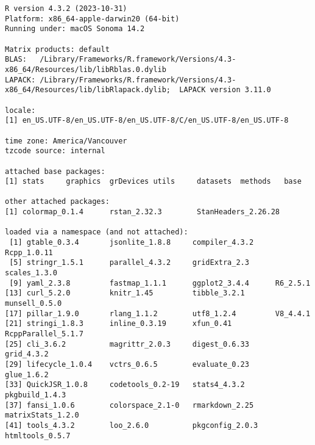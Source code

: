 \documentclass[
  letterpaper,
  DIV=11,
  numbers=noendperiod]{scrartcl}
\begin{document}
\begin{verbatim}
R version 4.3.2 (2023-10-31)
Platform: x86_64-apple-darwin20 (64-bit)
Running under: macOS Sonoma 14.2

Matrix products: default
BLAS:   /Library/Frameworks/R.framework/Versions/4.3-x86_64/Resources/lib/libRblas.0.dylib 
LAPACK: /Library/Frameworks/R.framework/Versions/4.3-x86_64/Resources/lib/libRlapack.dylib;  LAPACK version 3.11.0

locale:
[1] en_US.UTF-8/en_US.UTF-8/en_US.UTF-8/C/en_US.UTF-8/en_US.UTF-8

time zone: America/Vancouver
tzcode source: internal

attached base packages:
[1] stats     graphics  grDevices utils     datasets  methods   base     

other attached packages:
[1] colormap_0.1.4      rstan_2.32.3        StanHeaders_2.26.28

loaded via a namespace (and not attached):
 [1] gtable_0.3.4       jsonlite_1.8.8     compiler_4.3.2     Rcpp_1.0.11       
 [5] stringr_1.5.1      parallel_4.3.2     gridExtra_2.3      scales_1.3.0      
 [9] yaml_2.3.8         fastmap_1.1.1      ggplot2_3.4.4      R6_2.5.1          
[13] curl_5.2.0         knitr_1.45         tibble_3.2.1       munsell_0.5.0     
[17] pillar_1.9.0       rlang_1.1.2        utf8_1.2.4         V8_4.4.1          
[21] stringi_1.8.3      inline_0.3.19      xfun_0.41          RcppParallel_5.1.7
[25] cli_3.6.2          magrittr_2.0.3     digest_0.6.33      grid_4.3.2        
[29] lifecycle_1.0.4    vctrs_0.6.5        evaluate_0.23      glue_1.6.2        
[33] QuickJSR_1.0.8     codetools_0.2-19   stats4_4.3.2       pkgbuild_1.4.3    
[37] fansi_1.0.6        colorspace_2.1-0   rmarkdown_2.25     matrixStats_1.2.0 
[41] tools_4.3.2        loo_2.6.0          pkgconfig_2.0.3    htmltools_0.5.7   
\end{verbatim}
\end{document}
